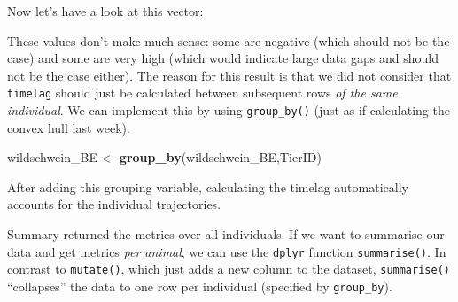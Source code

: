 \documentclass[]{book}
\newenvironment{Shaded}{\begin{snugshade}}{\end{snugshade}}
\newcommand{\KeywordTok}[1]{\textcolor[rgb]{0.13,0.29,0.53}{\textbf{{#1}}}}
\newcommand{\DataTypeTok}[1]{\textcolor[rgb]{0.13,0.29,0.53}{{#1}}}
\newcommand{\StringTok}[1]{\textcolor[rgb]{0.31,0.60,0.02}{{#1}}}
\newcommand{\NormalTok}[1]{{#1}}
\theoremstyle{definition}
\theoremstyle{definition}
\theoremstyle{definition}
\theoremstyle{remark}
\begin{document}
Now let's have a look at this vector:

\begin{Shaded}
\end{Shaded}

These values don't make much sense: some are negative (which should not
be the case) and some are very high (which would indicate large data
gaps and should not be the case either). The reason for this result is
that we did not consider that \texttt{timelag} should just be calculated
between subsequent rows \emph{of the same individual}. We can implement
this by using \texttt{group\_by()} (just as if calculating the convex
hull last week).

\begin{Shaded}
\begin{Highlighting}[]
\NormalTok{wildschwein_BE <-}\StringTok{ }\KeywordTok{group_by}\NormalTok{(wildschwein_BE,TierID)}
\end{Highlighting}
\end{Shaded}

After adding this grouping variable, calculating the timelag
automatically accounts for the individual trajectories.

\begin{Shaded}
\end{Shaded}

Summary returned the metrics over all individuals. If we want to
summarise our data and get metrics \emph{per animal}, we can use the
\texttt{dplyr} function \texttt{summarise()}. In contrast to
\texttt{mutate()}, which just adds a new column to the dataset,
\texttt{summarise()} ``collapses'' the data to one row per individual
(specified by \texttt{group\_by}).
\end{document}
